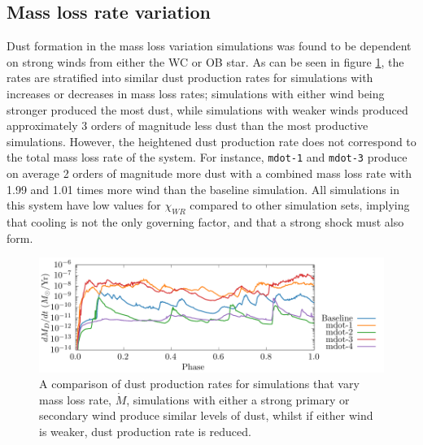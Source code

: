 \documentclass[fleqn,usenatbib]{mnras}
\begin{document}
\subsection{Mass loss rate variation}

Dust formation in the mass loss variation simulations was found to be dependent on strong winds from either the WC or OB star.
As can be seen in figure \ref{fig:mdotdustproductionrate}, the rates are stratified into similar dust production rates for simulations with increases or decreases in mass loss rates; simulations with either wind being stronger produced the most dust, while simulations with weaker winds produced approximately 3 orders of magnitude less dust than the most productive simulations.
However, the heightened dust production rate does not correspond to the total mass loss rate of the system.
For instance, \texttt{mdot-1} and \texttt{mdot-3} produce on average 2 orders of magnitude more dust with a combined mass loss rate with 1.99 and 1.01 times more wind than the baseline simulation.
All simulations in this system have low values for $\chi_{WR}$ compared to other simulation sets, implying that cooling is not the only governing factor, and that a strong shock must also form.

\begin{figure}
  \centering
  \includegraphics[width=\linewidth]{assets/mdot-results/mass-loss-phase-dust_rate.pdf}
  \caption[Dust production rate for simulations varying mass loss rate]{A comparison of dust production rates for simulations that vary mass loss rate, $\dot M$, simulations with either a strong primary or secondary wind produce similar levels of dust, whilst if either wind is weaker, dust production rate is reduced.}
  \label{fig:mdotdustproductionrate}
\end{figure}
\end{document}
